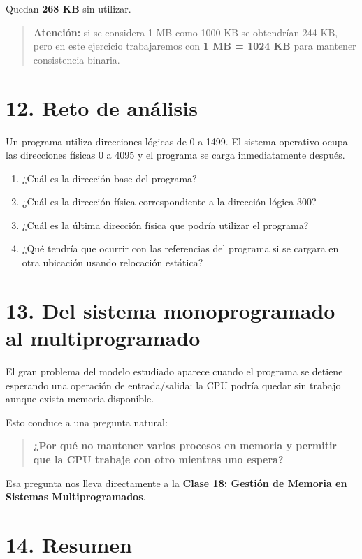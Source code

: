 \documentclass[
  spanish,
  letterpaper,
]{scrbook}
\providecommand{\tightlist}{%
  \setlength{\itemsep}{0pt}\setlength{\parskip}{0pt}}
\begin{document}
Quedan \textbf{268 KB} sin utilizar.

\begin{quote}
\textbf{Atención:} si se considera 1 MB como 1000 KB se obtendrían 244
KB, pero en este ejercicio trabajaremos con \textbf{1 MB = 1024 KB} para
mantener consistencia binaria.
\end{quote}

\section{12. Reto de análisis}\label{reto-de-anuxe1lisis}

Un programa utiliza direcciones lógicas de 0 a 1499. El sistema
operativo ocupa las direcciones físicas 0 a 4095 y el programa se carga
inmediatamente después.

\begin{enumerate}
\def\labelenumi{\arabic{enumi}.}
\tightlist
\item
  ¿Cuál es la dirección base del programa?
\item
  ¿Cuál es la dirección física correspondiente a la dirección lógica
  300?
\item
  ¿Cuál es la última dirección física que podría utilizar el programa?
\item
  ¿Qué tendría que ocurrir con las referencias del programa si se
  cargara en otra ubicación usando relocación estática?
\end{enumerate}

\section{13. Del sistema monoprogramado al
multiprogramado}\label{del-sistema-monoprogramado-al-multiprogramado}

El gran problema del modelo estudiado aparece cuando el programa se
detiene esperando una operación de entrada/salida: la CPU podría quedar
sin trabajo aunque exista memoria disponible.

Esto conduce a una pregunta natural:

\begin{quote}
\textbf{¿Por qué no mantener varios procesos en memoria y permitir que
la CPU trabaje con otro mientras uno espera?}
\end{quote}

Esa pregunta nos lleva directamente a la \textbf{Clase 18: Gestión de
Memoria en Sistemas Multiprogramados}.

\section{14. Resumen}\label{resumen-1}
\end{document}
